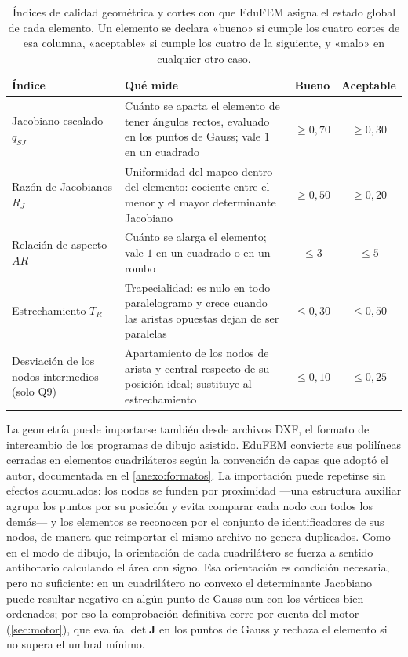 \begin{table}[H]
\centering
\caption[Índices de calidad geométrica y cortes con que EduFEM clasifica cada elemento.]{Índices de calidad geométrica y cortes con que EduFEM asigna el estado global de cada elemento. Un elemento se declara «bueno» si cumple los cuatro cortes de esa columna, «aceptable» si cumple los cuatro de la siguiente, y «malo» en cualquier otro caso.}
\label{tab:umbrales}
\setlength{\tabcolsep}{4pt}
\begin{tabular}{@{}>{\raggedright\arraybackslash}p{3.3cm} >{\raggedright\arraybackslash}p{6.6cm} cc@{}}
\toprule
\textbf{Índice} & \textbf{Qué mide} & \textbf{Bueno} & \textbf{Aceptable} \\
\midrule
Jacobiano escalado $q_{SJ}$ & Cuánto se aparta el elemento de tener ángulos rectos, evaluado en los puntos de Gauss; vale $1$ en un cuadrado & $\ge 0{,}70$ & $\ge 0{,}30$ \\
Razón de Jacobianos $R_J$ & Uniformidad del mapeo dentro del elemento: cociente entre el menor y el mayor determinante Jacobiano & $\ge 0{,}50$ & $\ge 0{,}20$ \\
Relación de aspecto $AR$ & Cuánto se alarga el elemento; vale $1$ en un cuadrado o en un rombo & $\le 3$ & $\le 5$ \\
Estrechamiento $T_R$ & Trapecialidad: es nulo en todo paralelogramo y crece cuando las aristas opuestas dejan de ser paralelas & $\le 0{,}30$ & $\le 0{,}50$ \\
\midrule
Desviación de los nodos intermedios (solo Q9) & Apartamiento de los nodos de arista y central respecto de su posición ideal; sustituye al estrechamiento & $\le 0{,}10$ & $\le 0{,}25$ \\
\bottomrule
\end{tabular}
{\singlespacing{}}
\end{table}

La geometría puede importarse también desde archivos DXF, el formato de intercambio de los programas de dibujo asistido. EduFEM convierte sus polilíneas cerradas en elementos cuadriláteros según la convención de capas que adoptó el autor, documentada en el \autoref{anexo:formatos}. La importación puede repetirse sin efectos acumulados: los nodos se funden por proximidad —una estructura auxiliar agrupa los puntos por su posición y evita comparar cada nodo con todos los demás— y los elementos se reconocen por el conjunto de identificadores de sus nodos, de manera que reimportar el mismo archivo no genera duplicados. Como en el modo de dibujo, la orientación de cada cuadrilátero se fuerza a sentido antihorario calculando el área con signo. Esa orientación es condición necesaria, pero no suficiente: en un cuadrilátero no convexo el determinante Jacobiano puede resultar negativo en algún punto de Gauss aun con los vértices bien ordenados; por eso la comprobación definitiva corre por cuenta del motor (\autoref{sec:motor}), que evalúa $\det\bm{J}$ en los puntos de Gauss y rechaza el elemento si no supera el umbral mínimo.

